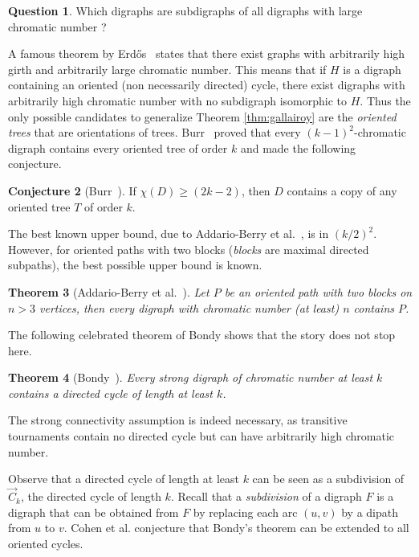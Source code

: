 \documentclass[utf8,10pt]{article}
\theoremstyle{plain}
\newtheorem{theorem}{Theorem}
\theoremstyle{definition}
\newtheorem{conjecture}[theorem]{Conjecture}
\newtheorem{question}[theorem]{Question}
\theoremstyle{remark}
\begin{document}
\begin{question}
Which digraphs are subdigraphs of all digraphs with large chromatic number ?
\end{question}



A famous theorem by Erd\H{o}s~\cite{Erd59} states that there exist graphs with arbitrarily high girth and arbitrarily large
chromatic number. This means that if $H$ is a digraph containing an oriented (non necessarily directed) cycle, there exist digraphs with arbitrarily high 
chromatic number with no subdigraph isomorphic to $H$. Thus the only possible candidates to generalize Theorem \ref{thm:gallairoy} are the {\it oriented trees} that are orientations of trees.
Burr~\cite{Burr80} proved that every $(k-1)^2$-chromatic digraph contains every oriented tree of order $k$ and made the following conjecture.

\begin{conjecture}[Burr~\cite{Burr80}]\label{cnj:tn}
	 If $\chi(D) \geq (2k-2)$, then $D$ contains a copy of any oriented tree $T$ of order $k$.
\end{conjecture}
The best known upper bound, due to Addario-Berry et al.~\cite{AHS+13}, is in $(k/2)^2$.
However, for oriented paths with two blocks ({\it blocks} are maximal directed subpaths), the best possible upper bound is known.

\begin{theorem}[Addario-Berry et al.~\cite{AHT07}]\label{thm:2blocks}
Let $P$ be an oriented path with two blocks on $n > 3$ vertices, then every digraph with chromatic number (at least) $n$ contains $P$. 
\end{theorem}



The following celebrated theorem of Bondy shows that  the story does not stop here.

\begin{theorem}[Bondy~\cite{Bon76}]\label{thm:bondy}
Every strong digraph of chromatic number at least $k$ contains a directed cycle of length at least $k$.
\end{theorem} 

The strong connectivity assumption is indeed necessary, as transitive tournaments contain no directed cycle but can have arbitrarily  high chromatic number. 

Observe that a directed cycle of length at least $k$ can be seen as a subdivision of $\vec{C}_k$, the directed cycle of length $k$.
Recall that a {\it subdivision} of a digraph $F$ is a digraph that can be obtained from $F$ by replacing each arc $(u,v)$ by a dipath from $u$ to $v$. Cohen et al.  \cite{CHLN16} conjecture that Bondy's theorem can be extended to all oriented cycles.
\end{document}
